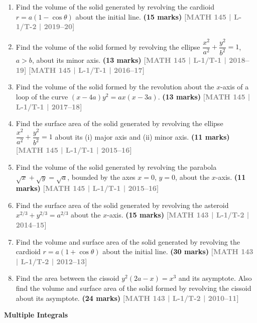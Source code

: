 \documentclass[12pt,a3paper]{article}
\newcommand{\yr}[1]{\hfill\textcolor{gray}{\small\textbf{[#1]}}}
\newcommand{\mk}[1]{\textcolor{orange!70!black}{\small\textbf{(#1 marks)}}}
\newcommand{\subtopic}[2]{%
  \vspace{10pt}
  \noindent\begin{tcolorbox}[colback=#1!8,colframe=#1,boxrule=0.6pt,arc=4pt,
    left=6pt,right=6pt,top=4pt,bottom=4pt]
    \small\bfseries\textcolor{#1}{#2}
  \end{tcolorbox}
  \vspace{2pt}
}
\begin{document}
\begin{enumerate}
\item Find the volume of the solid generated by revolving the cardioid $r=a(1-\cos\theta)$ about the initial line.
\mk{15} \yr{MATH 145 | L-1/T-2 | 2019--20}

\item Find the volume of the solid formed by revolving the ellipse $\dfrac{x^{2}}{a^{2}}+\dfrac{y^{2}}{b^{2}}=1$, $a>b$, about its minor axis.
\mk{13} \yr{MATH 145 | L-1/T-1 | 2018--19} \yr{MATH 145 | L-1/T-1 | 2016--17}

\item Find the volume of the solid formed by the revolution about the $x$-axis of a loop of the curve $(x-4a)y^{2}=ax(x-3a)$.
\mk{13} \yr{MATH 145 | L-1/T-1 | 2017--18}

\item Find the surface area of the solid generated by revolving the ellipse $\dfrac{x^{2}}{a^{2}}+\dfrac{y^{2}}{b^{2}}=1$ about its (i) major axis and (ii) minor axis.
\mk{11} \yr{MATH 145 | L-1/T-1 | 2015--16}

\item Find the volume of the solid generated by revolving the parabola $\sqrt{x}+\sqrt{y}=\sqrt{a}$, bounded by the axes $x=0$, $y=0$, about the $x$-axis.
\mk{11} \yr{MATH 145 | L-1/T-1 | 2015--16}

\item Find the surface area of the solid generated by revolving the asteroid $x^{2/3}+y^{2/3}=a^{2/3}$ about the $x$-axis.
\mk{15} \yr{MATH 143 | L-1/T-2 | 2014--15}

\item Find the volume and surface area of the solid generated by revolving the cardioid $r=a(1+\cos\theta)$ about the initial line.
\mk{30\textonehalf} \yr{MATH 143 | L-1/T-2 | 2012--13}

\item Find the area between the cissoid $y^{2}(2a-x)=x^{3}$ and its asymptote. Also find the volume and surface area of the solid formed by revolving the cissoid about its asymptote.
\mk{24\textonehalf} \yr{MATH 143 | L-1/T-2 | 2010--11}

\end{enumerate}

\subtopic{cB}{Multiple Integrals}
\label{sub:s2-multiple}
\end{document}
